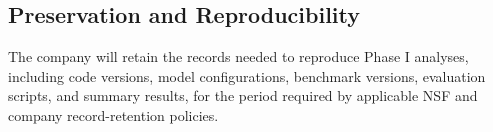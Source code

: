 \documentclass[11pt,letterpaper]{article}
\begin{document}
\subsection*{Preservation and Reproducibility}
The company will retain the records needed to reproduce Phase I analyses,
including code versions, model configurations, benchmark versions, evaluation
scripts, and summary results, for the period required by applicable NSF and
company record-retention policies.
\end{document}

